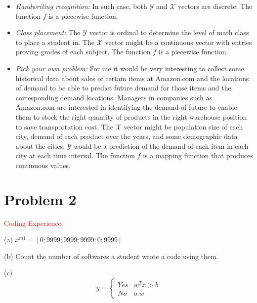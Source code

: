 \documentclass[12pt]{article}
\begin{document}
\begin{itemize}
\item \textit{Handwriting recognition:} In such case, both $\mathcal{Y}$ and $\mathcal{X}$ vectors are discrete. The function $f$ is a piecewise function.
\item \textit{Class placement:} The $\mathcal{Y}$ vector is ordinal to determine the level of math class to place a student in. The $\mathcal{X}$ vector might be a continuous vector with entries proving grades of each subject. The function $f$ is a piecewise function.
\item \textit{Pick your own problem:} For me it would be very interesting to collect some historical data about sales of certain items at Amazon.com and the locations of demand to be able to predict future demand for those items and the corresponding demand locations. Managers in companies such as Amazon.com are interested in identifying the demand of future to enable them to stock the right quantity of products in the right warehouse position to save transportation cost. The $\mathcal{X}$ vector might be population size of each city, demand of each product over the years, and some demographic data about the cities. $\mathcal{Y}$ would be a prediction of the demand of each item in each city at each time interval. The function $f$ is a mapping function that produces continuous values.  
\end{itemize}



\newpage


\section{Problem 2}
\textcolor{red}{Coding Experience.}

\vspace{0.2 in}

(a) $x^{m1}= [0;9999;9999;9999;0;9999]$

\vspace{0.2 in}

(b) Count the number of softwares a student wrote a code using them.

\vspace{0.2 in}

(c) \[ y = \begin{cases} 
      Yes & w^Tx>b \\
      No & o.w 
   \end{cases}
\]


\vspace{0.2 in}
\end{document}
